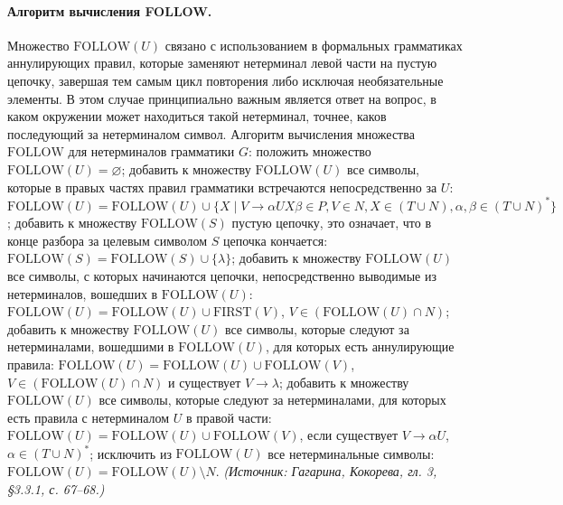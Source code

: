 \documentclass[a4paper,12pt]{article}
\begin{document}
\paragraph{Алгоритм вычисления FOLLOW.}
Множество \(\mathrm{FOLLOW}(U)\) связано с использованием в формальных грамматиках аннулирующих правил, которые заменяют нетерминал левой части на пустую цепочку, завершая тем самым цикл повторения либо исключая необязательные элементы. В этом случае принципиально важным является ответ на вопрос, в каком окружении может находиться такой нетерминал, точнее, каков последующий за нетерминалом символ. Алгоритм вычисления множества \(\mathrm{FOLLOW}\) для нетерминалов грамматики \(G\): положить множество \(\mathrm{FOLLOW}(U)=\varnothing\); добавить к множеству \(\mathrm{FOLLOW}(U)\) все символы, которые в правых частях правил грамматики встречаются непосредственно за \(U\): \(\mathrm{FOLLOW}(U)=\mathrm{FOLLOW}(U)\cup\{X\mid V\to\alpha UX\beta\in P, V\in N, X\in(T\cup N), \alpha,\beta\in(T\cup N)^*\}\); добавить к множеству \(\mathrm{FOLLOW}(S)\) пустую цепочку, это означает, что в конце разбора за целевым символом \(S\) цепочка кончается: \(\mathrm{FOLLOW}(S)=\mathrm{FOLLOW}(S)\cup\{\lambda\}\); добавить к множеству \(\mathrm{FOLLOW}(U)\) все символы, с которых начинаются цепочки, непосредственно выводимые из нетерминалов, вошедших в \(\mathrm{FOLLOW}(U)\): \(\mathrm{FOLLOW}(U)=\mathrm{FOLLOW}(U)\cup\mathrm{FIRST}(V)\), \(V\in(\mathrm{FOLLOW}(U)\cap N)\); добавить к множеству \(\mathrm{FOLLOW}(U)\) все символы, которые следуют за нетерминалами, вошедшими в \(\mathrm{FOLLOW}(U)\), для которых есть аннулирующие правила: \(\mathrm{FOLLOW}(U)=\mathrm{FOLLOW}(U)\cup\mathrm{FOLLOW}(V)\), \(V\in(\mathrm{FOLLOW}(U)\cap N)\) и существует \(V\to\lambda\); добавить к множеству \(\mathrm{FOLLOW}(U)\) все символы, которые следуют за нетерминалами, для которых есть правила с нетерминалом \(U\) в правой части: \(\mathrm{FOLLOW}(U)=\mathrm{FOLLOW}(U)\cup\mathrm{FOLLOW}(V)\), если существует \(V\to\alpha U\), \(\alpha\in(T\cup N)^*\); исключить из \(\mathrm{FOLLOW}(U)\) все нетерминальные символы: \(\mathrm{FOLLOW}(U)=\mathrm{FOLLOW}(U)\setminus N\).
\textit{(Источник: Гагарина, Кокорева, гл. 3, §3.3.1, с. 67--68.)}
\end{document}
